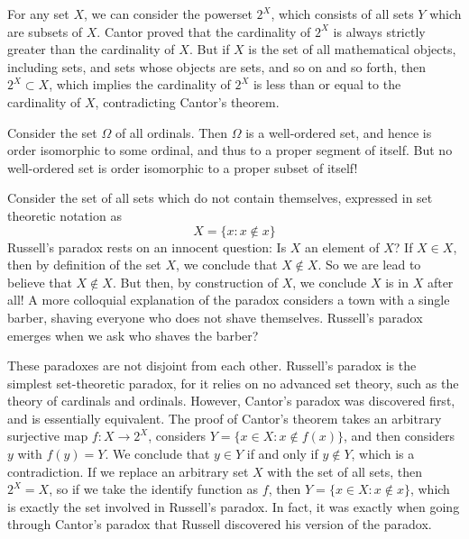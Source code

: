 \begin{example}
    For any set $X$, we can consider the powerset $2^X$, which consists of all sets $Y$ which are subsets of $X$. Cantor proved that the cardinality of $2^X$ is always strictly greater than the cardinality of $X$. But if $X$ is the set of all mathematical objects, including sets, and sets whose objects are sets, and so on and so forth, then $2^X \subset X$, which implies the cardinality of $2^X$ is less than or equal to the cardinality of $X$, contradicting Cantor's theorem.
\end{example}

\begin{example}
    Consider the set $\Omega$ of all ordinals. Then $\Omega$ is a well-ordered set, and hence is order isomorphic to some ordinal, and thus to a proper segment of itself. But no well-ordered set is order isomorphic to a proper subset of itself!
\end{example}

\begin{example}
    Consider the set of all sets which do not contain themselves, expressed in set theoretic notation as
    \[ X = \{ x: x \not \in x \} \]
    Russell's paradox rests on an innocent question: Is $X$ an element of $X$? If $X \in X$, then by definition of the set $X$, we conclude that $X \not \in X$. So we are lead to believe that $X \not \in X$. But then, by construction of $X$, we conclude $X$ is in $X$ after all! A more colloquial explanation of the paradox considers a town with a single barber, shaving everyone who does not shave themselves. Russell's paradox emerges when we ask who shaves the barber?
\end{example}

\begin{remark}
    These paradoxes are not disjoint from each other. Russell's paradox is the simplest set-theoretic paradox, for it relies on no advanced set theory, such as the theory of cardinals and ordinals. However, Cantor's paradox was discovered first, and is essentially equivalent. The proof of Cantor's theorem takes an arbitrary surjective map $f: X \to 2^X$, considers $Y = \{ x \in X: x \not \in f(x) \}$, and then considers $y$ with $f(y) = Y$. We conclude that $y \in Y$ if and only if $y \not \in Y$, which is a contradiction. If we replace an arbitrary set $X$ with the set of all sets, then $2^X = X$, so if we take the identify function as $f$, then $Y = \{ x \in X: x \not \in x \}$, which is exactly the set involved in Russell's paradox. In fact, it was exactly when going through Cantor's paradox that Russell discovered his version of the paradox.
\end{remark}

